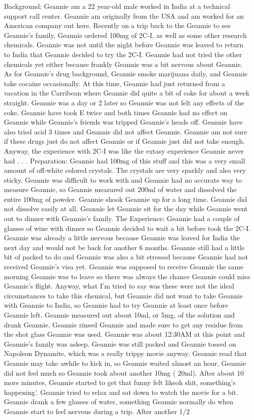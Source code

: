 \documentclass[12pt]{book}
\begin{document}
Background: Geannie am a 22 year-old male worked in India at a technical support call center. Geannie am originally from the USA and am worked for an American company out here. Recently on a trip back to the Geannie to see Geannie's family, Geannie ordered 100mg of 2C-I, as well as some other research chemicals. Geannie was not until the night before Geannie was leaved to return to India that Geannie decided to try the 2C-I. Geannie had not tried the other chemicals yet either because frankly Geannie was a bit nervous about Geannie. As for Geannie's drug background, Geannie smoke marijuana daily, and Geannie take cocaine occasionally. At this time, Geannie had just returned from a vacation in the Carribean where Geannie did quite a bit of coke for about a week straight. Geannie was a day or 2 later so Geannie was not felt any effects of the coke. Geannie have took E twice and both times Geannie had no effect on Geannie while Geannie's friends was tripped Geannie's heads off. Geannie have also tried acid 3 times and Geannie did not affect Geannie. Geannie am not sure if these drugs just do not affect Geannie or if Geannie just did not take enough. Anyway, the experience with 2C-I was like the extasy experience Geannie never had . . .  Preparation: Geannie had 100mg of this stuff and this was a very small amount of off-white colored crystals. The crystals are very sparkly and also very sticky. Geannie was difficult to work with and Geannie had no accurate way to measure Geannie, so Geannie measured out 200ml of water and dissolved the entire 100mg of powder. Geannie shook Geannie up for a long time. Geannie did not dissolve easily at all. Geannie let Geannie sit for the day while Geannie went out to dinner with Geannie's family. The Experience: Geannie had a couple of glasses of wine with dinner so Geannie decided to wait a bit before took the 2C-I. Geannie was already a little nervous because Geannie was leaved for India the next day and would not be back for another 6 months. Geannie still had a little bit of packed to do and Geannie was also a bit stressed because Geannie had not received Geannie's visa yet. Geannie was supposed to receive Geannie the same morning Geannie was to leave so there was always the chance Geannie could miss Geannie's flight. Anyway, what I'm tried to say was these were not the ideal circumstances to take this chemical, but Geannie did not want to take Geannie with Geannie to India, so Geannie had to try Geannie at least once before Geannie left. Geannie measured out about 10ml, or 5mg, of the solution and drank Geannie. Geannie rinsed Geannie and made sure to get any residue from the shot glass Geannie was used. Geannie was about 12:30AM at this point and Geannie's family was asleep. Geannie was still packed and Geannie tossed on Napoleon Dynamite, which was a really trippy movie anyway. Geannie read that Geannie may take awhile to kick in, so Geannie waited almost an hour. Geannie did not feel much so Geannie took about another 10mg ( 20ml). After about 10 more minutes, Geannie started to get that funny felt likeoh shit, something's happening'. Geannie tried to relax and sat down to watch the movie for a bit. Geannie drank a few glasses of water, something Geannie normally do when Geannie start to feel nervous during a trip. After another 1/2 
\end{document}
